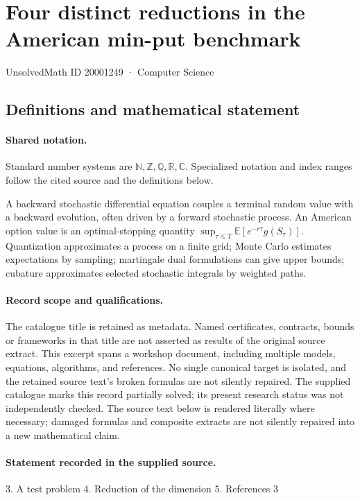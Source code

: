 \documentclass[11pt]{article}
\begin{document}
\setcounter{section}{20001248}
\section{Four distinct reductions in the American min-put benchmark}\label{20001249}
{\small\sffamily UnsolvedMath ID 20001249 · Computer Science}
\subsection{Definitions and mathematical statement}

\paragraph{Shared notation.}Standard number systems are $\mathbb N,\mathbb Z,\mathbb Q,\mathbb R,\mathbb C$. Specialized notation and index ranges follow the cited source and the definitions below.


A backward stochastic differential equation couples a terminal random value with a backward evolution, often driven by a forward stochastic process. An American option value is an optimal-stopping quantity $\sup_{\tau\leq T}\mathbb E[e^{-r\tau}g(S_\tau)]$. Quantization approximates a process on a finite grid; Monte Carlo estimates expectations by sampling; martingale dual formulations can give upper bounds; cubature approximates selected stochastic integrals by weighted paths.
\paragraph{Record scope and qualifications.}
The catalogue title is retained as metadata. Named certificates, contracts, bounds or frameworks in that title are not asserted as results of the original source extract.
This excerpt spans a workshop document, including multiple models, equations, algorithms, and references. No single canonical target is isolated, and the retained source text's broken formulas are not silently repaired. The supplied catalogue marks this record partially solved; its present research status was not independently checked.
The source text below is rendered literally where necessary; damaged formulas and composite extracts are not silently repaired into a new mathematical claim.
\paragraph{Statement recorded in the supplied source.}
3. A test problem 4. Reduction of the dimension 5. References 3
\end{document}
